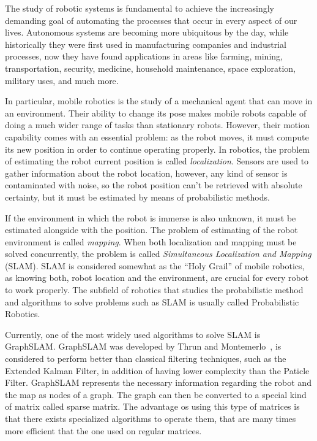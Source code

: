 The study of robotic systems is fundamental to achieve the increasingly demanding goal of automating the processes that occur in every aspect of our lives. Autonomous systems are becoming more ubiquitous by the day, while historically they were first used in manufacturing companies and industrial processes, now they have found applications in areas like farming, mining, transportation, security, medicine, household maintenance, space exploration, military uses, and much more.

In particular, mobile robotics is the study of a mechanical agent that can move in an environment. Their ability to change its pose makes mobile robots capable of doing a much wider range of tasks than stationary robots. However, their motion capability comes with an essential problem: as the robot moves, it must compute its new position in order to continue operating properly. In robotics, the problem of estimating the robot current position is called \textit{localization}. Sensors are used to gather information about the robot location, however, any kind of sensor is contaminated with noise, so the robot position can't be retrieved with absolute certainty, but it must be estimated by means of probabilistic methods.  


If the environment in which the robot is immerse is also unknown, it must be estimated alongside with the position. The problem of estimating of the robot environment is called \textit{mapping}. When both localization and mapping must be solved concurrently, the problem is called \textit{Simultaneous Localization and Mapping} (SLAM). SLAM is considered somewhat as the ``Holy Grail'' of mobile robotics, as knowing both, robot location and the environment, are crucial for every robot to work properly. The subfield of robotics that studies the probabilistic method and algorithms to solve problems such as SLAM is usually called Probabilistic Robotics.

Currently, one of the most widely used algorithms to solve SLAM is GraphSLAM. GraphSLAM was developed by Thrun and Montemerlo~\cite{graphslam}, is considered to perform better than classical filtering techniques, such as the Extended Kalman Filter, in addition of having lower complexity than the Paticle Filter. GraphSLAM represents the necessary information regarding the robot and the map as nodes of a graph. The graph can then be converted to a special kind of matrix called sparse matrix. The advantage os using this type of matrices is that there exists specialized algorithms to operate them, that are many times more efficient that the one used on regular matrices. 


